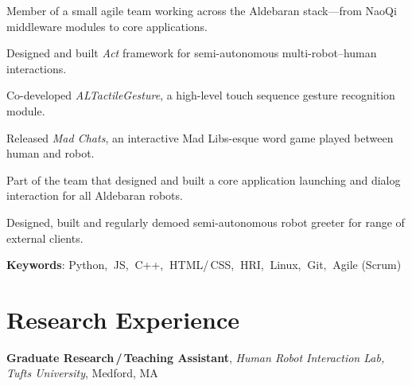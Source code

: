 \documentclass[10pt, letter]{article}
\newcommand{\years}[1]{\marginnote{\footnotesize #1}}
\newenvironment{desc*}{
  \begin{description}
    \setlength{\itemsep}{0.2pt}
    \setlength{\parskip}{-1pt}
    \setlength{\parsep}{0pt}
  }{
  \end{description}
}
\begin{document}
Member of a small agile team working across the Aldebaran stack---from NaoQi middleware modules to core applications.
\begin{itemize}[leftmargin=*, parsep=0pt, rightmargin=1.5cm]
  {\light
\item Designed and built \textit{Act} framework for semi-autonomous
  multi-robot--human interactions.
\item Co-developed \textit{ALTactileGesture}, a high-level touch sequence
  gesture recognition module.
\item Released \textit{Mad Chats}, an interactive Mad Libs-esque word
  game played between human and robot.
\item Part of the team that designed and built a core
  application launching and dialog interaction for all
  Aldebaran robots.
\item Designed, built and regularly demoed semi-autonomous robot
  greeter for range of external clients.
  }
\end{itemize}
\begin{desc*}
\item[\rm \color{redblue} \textbf{Keywords}:] Python,$\:$ JS,$\:$ C++,$\:$ HTML/\,CSS,$\:$
  HRI,$\:$ Linux,$\:$ Git,$\:$ Agile (Scrum)\bigbreak
\end{desc*}

\section*{Research Experience}
\years{2012 - 2014} 
\textbf{\fontsize{10.5pt}{1em}\selectfont Graduate Research\,/\,Teaching Assistant}, 
\textit{Human Robot Interaction Lab, Tufts University}, Medford, MA\bigskip
\end{document}
